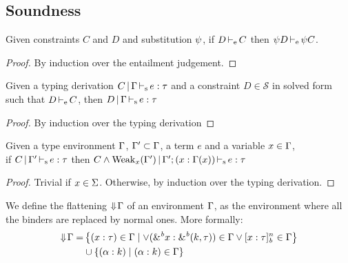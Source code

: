 \newcommand\mcase[1]{\noindent\textbf{Case }#1\\\noindent}

\subsection{Soundness}

\begin{lemma}
  \label{lemma:constrsubst}
  Given constraints $C$ and $D$ and substitution $\mathrm{\psi}$, if $D \operatorname{\vdash_e} C$
  then $\mathrm{\psi} D \operatorname{\vdash_e} \mathrm{\psi} C$.
  \begin{proof}
    By induction over the entailment judgement.
  \end{proof}
\end{lemma}

\begin{lemma}
  \label{lemma:constrimply}
  Given a typing derivation $C \operatorname{|} \Gamma \operatorname{\vdash_s} e : \tau$ and
  a constraint $D \in \mathcal S$ in solved form such that $D \operatorname{\vdash_e} C$, then
  $D \operatorname{|} \Gamma \operatorname{\vdash_s} e : \tau$
  \begin{proof}
    By induction over the typing derivation
  \end{proof}
\end{lemma}


\begin{lemma}
  \label{lemma:typ:weakening}
  Given a type environment $\Gamma$, $\Gamma' \subset \Gamma$, a term $e$ and a variable $x\in\Gamma$,\\
  if $C \operatorname{|} \Gamma' \operatorname{\vdash_s} e : \tau$
  then $C\wedge \operatorname{Weak}_{x}(\Gamma') \operatorname{|} \Gamma';(x : \Gamma(x)) \operatorname{\vdash_s} e : \tau$

  \begin{proof}
    Trivial if $x \in \Sigma$. Otherwise, by induction over the typing derivation.
  \end{proof}
\end{lemma}


We define the flattening $\Downarrow\!\Gamma$ of an environment $\Gamma$, as the environment
where all the binders are replaced by normal ones. More formally:
\begin{align*}
  \Downarrow\!\Gamma
  =& \left\{ (x : \tau) \in\Gamma \mid
    \vee ({\&}^{\textit{b}}x : {\&}^{\textit{b}}(k,\tau))\in\Gamma
    \vee [x : \tau]_{\textit{b}}^n\in\Gamma
    \right\}\\
  &\cup \left\{ (\alpha : k) \mid (\alpha : k)\in\Gamma \right\}
\end{align*}

